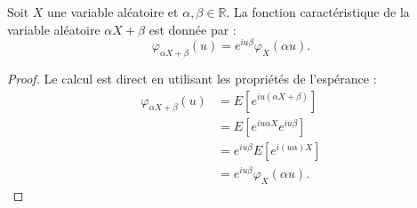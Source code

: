 \begin{proposition}
Soit $X$ une variable aléatoire et $\alpha, \beta \in \mathbb{R}$. La fonction caractéristique de la variable aléatoire $\alpha X + \beta$ est donnée par :
\[ \varphi_{\alpha X + \beta}(u) = e^{iu\beta} \varphi_X(\alpha u). \]
\end{proposition}
\begin{proof}
Le calcul est direct en utilisant les propriétés de l'espérance :
\begin{align*}
\varphi_{\alpha X + \beta}(u) &= E[e^{iu(\alpha X + \beta)}] \\
&= E[e^{iu\alpha X} e^{iu\beta}] \\
&= e^{iu\beta} E[e^{i(u\alpha)X}] \\
&= e^{iu\beta} \varphi_X(\alpha u).
\end{align*}
\end{proof}
